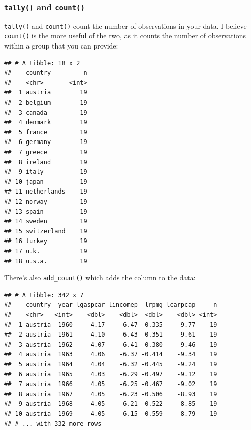 \documentclass[]{gitbook}
\newenvironment{Shaded}{\begin{snugshade}}{\end{snugshade}}
\newcommand{\KeywordTok}[1]{\textcolor[rgb]{0.13,0.29,0.53}{\textbf{#1}}}
\newcommand{\NormalTok}[1]{#1}
\newcommand{\OperatorTok}[1]{\textcolor[rgb]{0.81,0.36,0.00}{\textbf{#1}}}
\newcommand{\StringTok}[1]{\textcolor[rgb]{0.31,0.60,0.02}{#1}}
\theoremstyle{definition}
\theoremstyle{definition}
\theoremstyle{definition}
\theoremstyle{remark}
\begin{document}
\hypertarget{tally-and-count}{%
\subsubsection{\texorpdfstring{\texttt{tally()} and
\texttt{count()}}{tally() and count()}}\label{tally-and-count}}

\texttt{tally()} and \texttt{count()} count the number of observations
in your data. I believe \texttt{count()} is the more useful of the two,
as it counts the number of observations within a group that you can
provide:

\begin{Shaded}
\end{Shaded}

\begin{verbatim}
## # A tibble: 18 x 2
##    country         n
##    <chr>       <int>
##  1 austria        19
##  2 belgium        19
##  3 canada         19
##  4 denmark        19
##  5 france         19
##  6 germany        19
##  7 greece         19
##  8 ireland        19
##  9 italy          19
## 10 japan          19
## 11 netherlands    19
## 12 norway         19
## 13 spain          19
## 14 sweden         19
## 15 switzerland    19
## 16 turkey         19
## 17 u.k.           19
## 18 u.s.a.         19
\end{verbatim}

There's also \texttt{add\_count()} which adds the column to the data:

\begin{Shaded}
\end{Shaded}

\begin{verbatim}
## # A tibble: 342 x 7
##    country  year lgaspcar lincomep  lrpmg lcarpcap     n
##    <chr>   <int>    <dbl>    <dbl>  <dbl>    <dbl> <int>
##  1 austria  1960     4.17    -6.47 -0.335    -9.77    19
##  2 austria  1961     4.10    -6.43 -0.351    -9.61    19
##  3 austria  1962     4.07    -6.41 -0.380    -9.46    19
##  4 austria  1963     4.06    -6.37 -0.414    -9.34    19
##  5 austria  1964     4.04    -6.32 -0.445    -9.24    19
##  6 austria  1965     4.03    -6.29 -0.497    -9.12    19
##  7 austria  1966     4.05    -6.25 -0.467    -9.02    19
##  8 austria  1967     4.05    -6.23 -0.506    -8.93    19
##  9 austria  1968     4.05    -6.21 -0.522    -8.85    19
## 10 austria  1969     4.05    -6.15 -0.559    -8.79    19
## # ... with 332 more rows
\end{verbatim}
\end{document}
